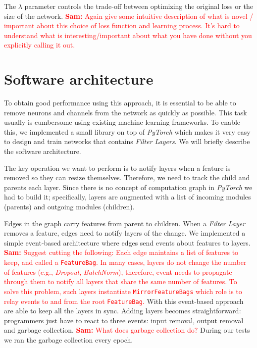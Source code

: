 \documentclass[sigconf]{acmart}
\newcommand{\srm}[1]{\textcolor{red}{{\bf Sam:} #1}}
\begin{document}
The $\lambda$ parameter controls the trade-off between optimizing the original loss or the size of the network.  \srm{Again give some intuitive description of what is novel / important about this choice of loss function and learning process.  It's hard to understand what is interesting/important about what you have done without you explicitly calling it out.}

\section{Software architecture}

To obtain good performance using this approach, it is essential to be able to remove neurons and channels from the network as quickly as possible. This task usually is cumbersome using existing machine learning frameworks. To enable this, we implemented a small library on top of \textit{PyTorch} which makes it very easy to design and train networks that contains \textit{Filter Layers}. We will briefly describe the software architecture.
\par The key operation we want to perform is to notify layers when a feature is removed so they can resize themselves. Therefore, we need to track the child and parents each layer. Since there is no concept of computation graph in \textit{PyTorch} we had to build it;  specifically,  layers are augmented with a list of incoming modules (parents) and outgoing modules (children).
\par Edges in the graph carry features from parent to children. When a \textit{Filter Layer} removes a feature, edges need to notify layers of the change.  We implemented a simple event-based
architecture where edges send events about features to layers. 
\srm{Suggest cutting the following: Each  edge maintains a list of features to keep, and called a \texttt{FeatureBag}. In many cases, layers do not change the number of features (e.g., \textit{Dropout}, \textit{BatchNorm}), therefore, event needs to propagate through them to notify all layers that share the same number of features. To solve this problem, such layers instantiate \texttt{MirrorFeatureBags} which role is to relay events to and from the root \texttt{FeatureBag}.} With this event-based approach are able to keep all the layers in sync. Adding layers becomes straightforward: programmers just have to react to three events: input removal, output removal and garbage collection. \srm{What does garbage collection do?} During our tests we ran the garbage collection every epoch.
\end{document}
